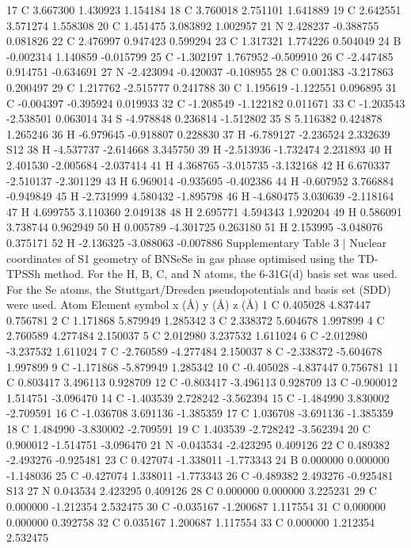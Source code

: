 17 C 3.667300 1.430923 1.154184
18 C 3.760018 2.751101 1.641889
19 C 2.642551 3.571274 1.558308
20 C 1.451475 3.083892 1.002957
21 N 2.428237 -0.388755 0.081826
22 C 2.476997 0.947423 0.599294
23 C 1.317321 1.774226 0.504049
24 B -0.002314 1.140859 -0.015799
25 C -1.302197 1.767952 -0.509910
26 C -2.447485 0.914751 -0.634691
27 N -2.423094 -0.420037 -0.108955
28 C 0.001383 -3.217863 0.200497
29 C 1.217762 -2.515777 0.241788
30 C 1.195619 -1.122551 0.096895
31 C -0.004397 -0.395924 0.019933
32 C -1.208549 -1.122182 0.011671
33 C -1.203543 -2.538501 0.063014
34 S -4.978848 0.236814 -1.512802
35 S 5.116382 0.424878 1.265246
36 H -6.979645 -0.918807 0.228830
37 H -6.789127 -2.236524 2.332639
S12
38 H -4.537737 -2.614668 3.345750
39 H -2.513936 -1.732474 2.231893
40 H 2.401530 -2.005684 -2.037414
41 H 4.368765 -3.015735 -3.132168
42 H 6.670337 -2.510137 -2.301129
43 H 6.969014 -0.935695 -0.402386
44 H -0.607952 3.766884 -0.949849
45 H -2.731999 4.580432 -1.895798
46 H -4.680475 3.030639 -2.118164
47 H 4.699755 3.110360 2.049138
48 H 2.695771 4.594343 1.920204
49 H 0.586091 3.738744 0.962949
50 H 0.005789 -4.301725 0.263180
51 H 2.153995 -3.048076 0.375171
52 H -2.136325 -3.088063 -0.007886
Supplementary Table 3 | Nuclear coordinates of S1 geometry of BNSeSe in gas phase
optimised using the TD-TPSSh method. For the H, B, C, and N atoms, the 6-31G(d) basis set
was used. For the Se atoms, the Stuttgart/Dresden pseudopotentials and basis set (SDD) were
used.
Atom Element symbol x (Å) y (Å) z (Å)
1 C 0.405028 4.837447 0.756781
2 C 1.171868 5.879949 1.285342
3 C 2.338372 5.604678 1.997899
4 C 2.760589 4.277484 2.150037
5 C 2.012980 3.237532 1.611024
6 C -2.012980 -3.237532 1.611024
7 C -2.760589 -4.277484 2.150037
8 C -2.338372 -5.604678 1.997899
9 C -1.171868 -5.879949 1.285342
10 C -0.405028 -4.837447 0.756781
11 C 0.803417 3.496113 0.928709
12 C -0.803417 -3.496113 0.928709
13 C -0.900012 1.514751 -3.096470
14 C -1.403539 2.728242 -3.562394
15 C -1.484990 3.830002 -2.709591
16 C -1.036708 3.691136 -1.385359
17 C 1.036708 -3.691136 -1.385359
18 C 1.484990 -3.830002 -2.709591
19 C 1.403539 -2.728242 -3.562394
20 C 0.900012 -1.514751 -3.096470
21 N -0.043534 -2.423295 0.409126
22 C 0.489382 -2.493276 -0.925481
23 C 0.427074 -1.338011 -1.773343
24 B 0.000000 0.000000 -1.148036
25 C -0.427074 1.338011 -1.773343
26 C -0.489382 2.493276 -0.925481
S13
27 N 0.043534 2.423295 0.409126
28 C 0.000000 0.000000 3.225231
29 C 0.000000 -1.212354 2.532475
30 C -0.035167 -1.200687 1.117554
31 C 0.000000 0.000000 0.392758
32 C 0.035167 1.200687 1.117554
33 C 0.000000 1.212354 2.532475
